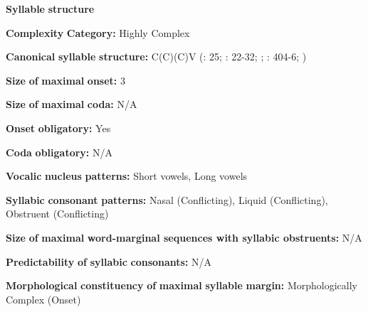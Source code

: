 \documentclass[output=paper]{langsci/langscibook}
\begin{document}
\begin{styleBody}
\textbf{Syllable} \textbf{structure}
\end{styleBody}

\begin{styleBody}
\textbf{Complexity} \textbf{Category:} Highly Complex
\end{styleBody}

\begin{styleBody}
\textbf{Canonical} \textbf{syllable} \textbf{structure:} C(C)(C)V (\citealt{Hanson2010}: 25; \citealt{Matteson1965}: 22-32; \citealt{MattesonPike1958}; \citealt{Lin1997}: 404-6; \citealt{Lin1993})
\end{styleBody}

\begin{styleBody}
\textbf{Size} \textbf{of} \textbf{maximal} \textbf{onset:} 3
\end{styleBody}

\begin{styleBody}
\textbf{Size} \textbf{of} \textbf{maximal} \textbf{coda:} N/A
\end{styleBody}

\begin{styleBody}
\textbf{Onset} \textbf{obligatory:} Yes
\end{styleBody}

\begin{styleBody}
\textbf{Coda} \textbf{obligatory:} N/A
\end{styleBody}

\begin{styleBody}
\textbf{Vocalic} \textbf{nucleus} \textbf{patterns:} Short vowels, Long vowels
\end{styleBody}

\begin{styleBody}
\textbf{Syllabic} \textbf{consonant} \textbf{patterns:} Nasal (Conflicting), Liquid (Conflicting), Obstruent (Conflicting)
\end{styleBody}

\begin{styleBody}
\textbf{Size} \textbf{of} \textbf{maximal} \textbf{word{}-marginal sequences with syllabic obstruents:} N/A
\end{styleBody}

\begin{styleBody}
\textbf{Predictability} \textbf{of} \textbf{syllabic} \textbf{consonants:} N/A
\end{styleBody}

\begin{styleBody}
\textbf{Morphological} \textbf{constituency} \textbf{of} \textbf{maximal} \textbf{syllable} \textbf{margin:} Morphologically Complex (Onset)
\end{styleBody}
\end{document}
